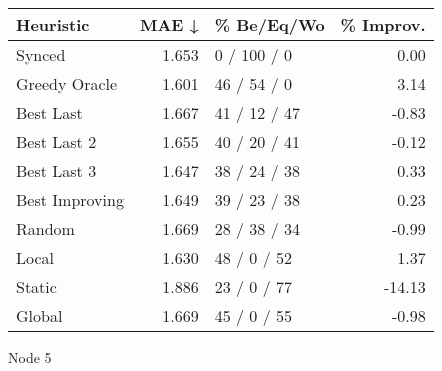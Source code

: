 \begin{tabular}{lrlr}
\toprule
\textbf{Heuristic} & \textbf{MAE ↓} & \textbf{\% Be/Eq/Wo} & \textbf{\% Improv.} \\
\midrule
            Synced &          1.653 &          0 / 100 / 0 &                0.00 \\
     Greedy Oracle &          1.601 &          46 / 54 / 0 &                3.14 \\
         Best Last &          1.667 &         41 / 12 / 47 &               -0.83 \\
       Best Last 2 &          1.655 &         40 / 20 / 41 &               -0.12 \\
       Best Last 3 &          1.647 &         38 / 24 / 38 &                0.33 \\
    Best Improving &          1.649 &         39 / 23 / 38 &                0.23 \\
            Random &          1.669 &         28 / 38 / 34 &               -0.99 \\
             Local &          1.630 &          48 / 0 / 52 &                1.37 \\
            Static &          1.886 &          23 / 0 / 77 &              -14.13 \\
            Global &          1.669 &          45 / 0 / 55 &               -0.98 \\
\bottomrule
\end{tabular}
\caption{Node 5}
\label{tab:ds_non_lr05_le1_bs2_5}

